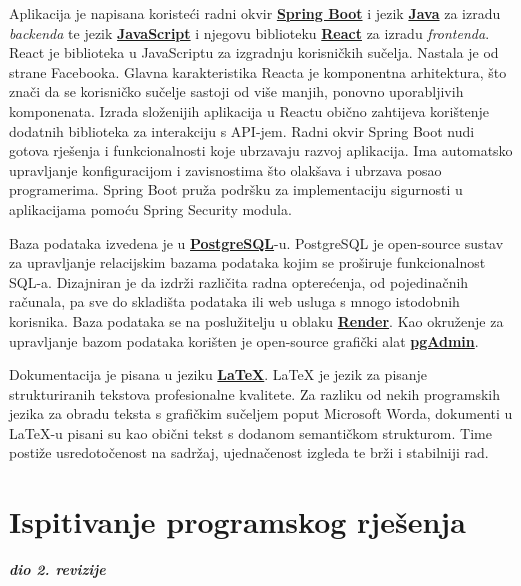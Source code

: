 			 Aplikacija je napisana koristeći radni okvir \textbf{\href{https://spring.io/projects/spring-boot}{Spring Boot}} i jezik 
			 \textbf{\href{https://www.java.com/en/}{Java}} za izradu \textit{backenda} te jezik \textbf{\href{https://www.javascript.com/}{JavaScript}} 
			 i njegovu biblioteku \textbf{\href{https://react.dev/}{React}} za izradu \textit{frontenda}. React je biblioteka 
			 u JavaScriptu za izgradnju korisničkih sučelja. Nastala je od strane Facebooka. Glavna karakteristika Reacta je komponentna 
			 arhitektura, što znači da se korisničko sučelje sastoji od više manjih, ponovno uporabljivih komponenata. Izrada 
			 složenijih aplikacija u Reactu obično zahtijeva korištenje dodatnih biblioteka za interakciju s API-jem. Radni okvir 
			 Spring Boot nudi gotova rješenja i funkcionalnosti koje ubrzavaju razvoj aplikacija. Ima automatsko upravljanje 
			 konfiguracijom i zavisnostima što olakšava i ubrzava posao programerima. Spring Boot pruža podršku za implementaciju 
			 sigurnosti u aplikacijama pomoću Spring Security modula. 

			 Baza podataka izvedena je u \textbf{\href{https://www.postgresql.org/}{PostgreSQL}}-u. PostgreSQL je open-source sustav za upravljanje relacijskim bazama
			 podataka kojim se proširuje funkcionalnost SQL-a. Dizajniran je da izdrži različita radna opterećenja, od 
			 pojedinačnih računala, pa sve do skladišta podataka ili web usluga s mnogo istodobnih korisnika. Baza podataka
			 se na poslužitelju u oblaku \textbf{\href{https://render.com/}{Render}}. Kao okruženje za upravljanje bazom
			 podataka korišten je open-source grafički alat \textbf{\href{https://www.pgadmin.org/}{pgAdmin}}.

		     Dokumentacija je pisana u jeziku \textbf{\href{https://www.latex-project.org/}{LaTeX}}. LaTeX je jezik za pisanje
			 strukturiranih tekstova profesionalne kvalitete. Za razliku od nekih programskih jezika za obradu teksta s grafičkim
			 sučeljem poput Microsoft Worda, dokumenti u LaTeX-u pisani su kao obični tekst s dodanom semantičkom strukturom. Time 
			 postiže usredotočenost na sadržaj, ujednačenost izgleda te brži i stabilniji rad.

			\eject 
		
	
		\section{Ispitivanje programskog rješenja}
			
			\textbf{\textit{dio 2. revizije}}\\
			

